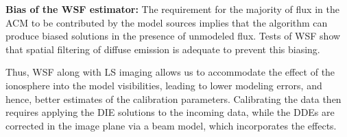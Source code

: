 \documentclass[referee]{aa}
\begin{document}
\begin{table}[tbh]
\caption{Flux ratios of bright sources within snapshot from Obs. 3.}
\label{tab:Flux-ratios-of-1}
\end{table}


\textbf{Bias of the WSF estimator:} The  requirement for the majority of flux in
the ACM  to be contributed by the  model sources implies that  the algorithm can
produce biased solutions  in the presence of unmodeled flux.   Tests of WSF show
that spatial filtering of diffuse emission is adequate to prevent this biasing.

Thus,  WSF along with  LS imaging  allows us  to accommodate  the effect  of the
ionosphere into  the model visibilities,  leading to lower modeling  errors, and
hence, better estimates of the calibration parameters.  Calibrating the data then
requires applying  the DIE solutions  to the incoming  data, while the  DDEs are
corrected in the image plane via a beam model, which incorporates the effects.
\end{document}
